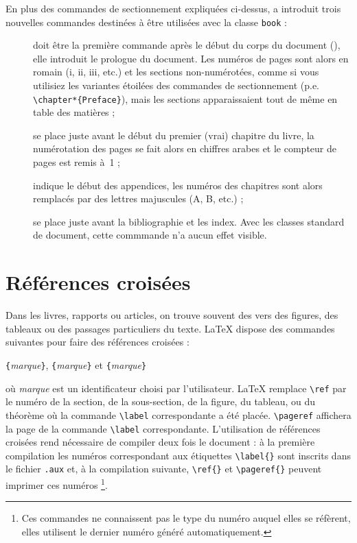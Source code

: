 En plus des commandes de sectionnement expliquées ci-dessus, \LaTeXe{}
a introduit trois nouvelles commandes destinées à être utilisées avec
la classe \texttt{book} :
\begin{description}
\item[] doit être la première commande après le
  \vadjust{\pagebreak[3]}%
  début du corps du document (\verb||),
    elle introduit le prologue du document.
    Les numéros de pages sont alors en romain (i, ii, iii, etc.) et
    les sections non-numérotées, comme si vous utilisiez les variantes
    étoilées des commandes de sectionnement
    (p.e. \verb|\chapter*{Preface}|), mais les sections
    apparaissaient tout de même en table des matières ;

\item[] se place juste avant le début du premier
  (vrai) chapitre du livre,  la numérotation des pages se fait alors
  en chiffres arabes et le compteur de pages est remis à~1 ;

\item[] indique le début des appendices, les numéros
  des chapitres sont alors remplacés par des lettres majuscules (A, B,
  etc.) ;

\item[] se place juste avant la bibliographie et les
  index. Avec les classes standard de document, cette commmande n'a
  aucun effet visible.
\end{description}

\section{Références croisées}

Dans les livres, rapports ou articles, on trouve souvent des
 vers des figures, des tableaux ou des passages
particuliers du texte. \LaTeX{} dispose des commandes suivantes pour
faire des références croisées :

\begin{lscommand}
\verb|{|\emph{marque}\verb|}|, \verb|{|\emph{marque}\verb|}|
et \verb|{|\emph{marque}\verb|}|
\end{lscommand}
\noindent où \emph{marque} est un identificateur choisi par
l'utilisateur. \LaTeX{} remplace \verb|\ref| par le numéro de la
section, de la sous-section, de la figure, du tableau, ou du théorème
où la commande \verb|\label| correspondante a été
placée. \verb|\pageref| affichera la page de la commande \verb|\label|
correspondante.
L'utilisation de références croisées rend nécessaire de compiler deux fois le
document : à la première compilation les numéros correspondant aux étiquettes
\verb|\label{}| sont inscrits dans le fichier \texttt{.aux} et, à la
compilation suivante, \verb|\ref{}| et \verb|\pageref{}| peuvent imprimer
ces numéros%
\footnote{Ces commandes ne connaissent pas le type du numéro auquel
elles se réfèrent, elles utilisent le dernier numéro généré
automatiquement.}.

